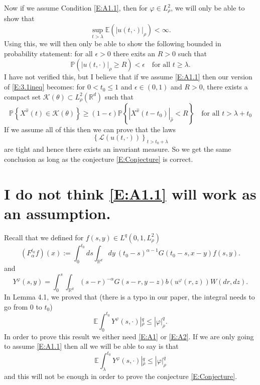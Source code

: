 \documentclass{article}
\numberwithin{equation}{section}
\newcommand{\R}{\mathbb{R}}
\begin{document}
Now if we assume Condition \eqref{E:A1.1}, then for $\varphi \in L^2_{\rho}$, we will only be able to show that
	\[
		\sup_{t>\lambda} \mathbb{E} \left( |u(t,\cdot)|_{\rho} \right) < \infty.
	\]
Using this, we will then only be able to show the following bounded in probability statement: for all $\epsilon >0$ there exits an $R>0$ such that
	\[
		 \mathbb{P} \left( |u(t,\cdot)|_{\rho} \ge R \right) < \epsilon \quad \text{for all } t \ge \lambda.
	\]
I have not verified this, but I believe that if we assume \eqref{E:A1.1} then our version of \eqref{E:3.1ineq} becomes: for $0 < t_0 \le 1$ and $\epsilon \in (0,1)$ and $R>0$, there exists a compact set $\mathscr{K}(\theta) \subset L^2_{\rho}(\R^d)$ such that 
	\begin{equation}\label{E:Conjecture}
			\mathbb{P}\left\{ X^{\hat x}(t) \in \mathscr{K}(\theta) \right\} \ge (1-\epsilon)\mathbb{P} \left\{ | X^{\hat x}(t-t_0)|_{\hat \rho} < R \right\} \quad \text{for all } t> \lambda + t_0
	\end{equation}
If we assume all of this then we can prove that the laws
	\[
		\left\{\mathscr{L}(u(t,\cdot))\right\}_{t>t_0 + \lambda}
	\]
are tight and hence there exists an invariant measure. So we get the same conclusion as long as the conjecture \eqref{E:Conjecture} is correct. 

\section{I do not think \eqref{E:A1.1} will work as an assumption.}

Recall that we defined for $f(s,y) \in L^q(0,1,L^2_{\rho})$
	\[
		\left(F_{\alpha}^{t_0} f\right)(x) := \int_0^{t_0} ds \int_{\R^d} dy \: (t_0-s)^{\alpha-1}G(t_0-s,x-y)f(s,y) .
	\]
and
	\[
		Y^\varphi(s,y) =\int_0^s \int_{\R^d} (s-r)^{-\alpha}G(s-r,y-z)b(u^\varphi(r,z))W(dr,dz).
	\]
In Lemma 4.1, we proved that (there is a typo in our paper, the integral needs to go from $0$ to $t_0$)
	\begin{equation}\label{E:YNorm}
		\mathbb{E}\int_0^{t_0} Y^{\varphi}(s,\cdot)|_{\rho}^q \le |\varphi|_\rho^q.
	\end{equation}
In order to prove this result we either need \eqref{E:A1} or \eqref{E:A2}. If we are only going to assume \eqref{E:A1.1} then all we will be able to say is that
	\begin{equation}\label{E:YNorm1.1}
		\mathbb{E}\int_\lambda^{t_0} Y^{\varphi}(s,\cdot)|_{\rho}^q \le |\varphi|_\rho^q
	\end{equation}
and this will not be enough in order to prove the conjecture \eqref{E:Conjecture}. 
\end{document}
